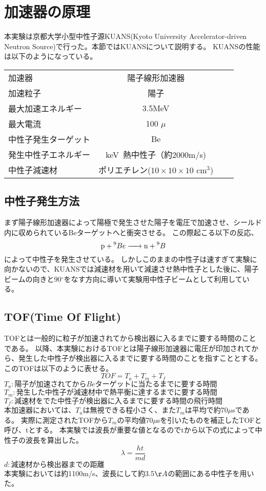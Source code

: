 
\section{加速器の原理}
本実験は京都大学小型中性子源KUANS(Kyoto University Accelerator-driven Neutron Source)で行った。本節ではKUANSについて説明する。
KUANSの性能は以下のようになっている。
\begin{table}[htb]
\begin{tabular}{lcrr}
加速器&陽子線形加速器\\
加速粒子&陽子\\
最大加速エネルギー&3.5MeV\\
最大電流&100 $\mu$ \\
中性子発生ターゲット&Be\\
発生中性子エネルギー&keV~熱中性子（約2000m/s)\\
中性子減速材&ポリエチレン($10\times10\times10$ cm$^3$)\\
\end{tabular}
\end{table}
\subsection{中性子発生方法}
まず陽子線形加速器によって陽極で発生させた陽子を電圧で加速させ、シールド内に収められているBeターゲットへと衝突させる。
この際起こる以下の反応、\begin{equation}
\ce{p + {^{9}Be} ->n + {^{9}B}}\end{equation}
によって中性子を発生させている。
しかしこのままの中性子は速すぎて実験に向かないので、KUANSでは減速材を用いて減速させ熱中性子とした後に、陽子ビームの向きと90$^{\circ}$をなす方向に導いて実験用中性子ビームとして利用している。
\subsection {TOF(Time Of Flight)}
TOFとは一般的に粒子が加速されてから検出器に入るまでに要する時間のことである。
以降、本実験におけるTOFとは陽子線形加速器に電圧が印加されてから、発生した中性子が検出器に入るまでに要する時間のことを指すこととする。
このTOFは以下のように表せる。
\begin{equation}TOF=T_a+T_m+T_f\end{equation}
$T_a:陽子が加速されてからBeターゲットに当たるまでに要する時間$\\
$T_m:発生した中性子が減速材中で熱平衡に達するまでに要する時間$\\
$T_f:減速材をでた中性子が検出器に入るまでに要する時間の飛行時間$\\
本加速器においては、$T_a$は無視できる程小さく、また$T_m$は平均で約70$\mu$sである。
実際に測定されたTOFから$T_m$の平均値70$\mu$sを引いたものを補正したTOFと呼び、tとする。
本実験では波長が重要な値となるのでtから以下の式によって中性子の波長を算出した。
\begin{equation}
{\lambda}={\frac{ht}{md}}
\end{equation}
$d:減速材から検出器までの距離$\\
本実験においては約1100m/s、波長にして約3.5$\AA$の範囲にある中性子を用いた。
